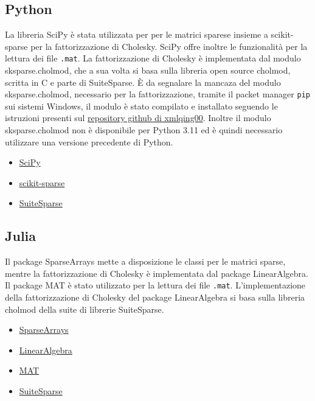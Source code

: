 \documentclass[a4paper, 12pt]{article}
\begin{document}
        \subsection{Python}
            La libreria SciPy è stata utilizzata per per le matrici sparese insieme a scikit-sparse per la 
            fattorizzazione di Cholesky.
            SciPy offre inoltre le funzionalità per la lettura dei file \texttt{.mat}.
            La fattorizzazione di Cholesky è implementata dal modulo sksparse.cholmod, che a sua volta si basa sulla
            libreria open source cholmod, scritta in C e parte di SuiteSparse.
            \`E da segnalare la mancaza del modulo sksparse.cholmod, necessario per la fattorizzazione, tramite il 
            packet manager \texttt{pip} sui sistemi Windows, il modulo è stato compilato e installato seguendo le
            istruzioni presenti sul 
            \href{https://github.com/xmlyqing00/Cholmod-Scikit-Sparse-Windows}{repository github di xmlqing00}.
            Inoltre il modulo sksparse.cholmod non è disponibile per Python 3.11
            ed è quindi necessario utilizzare una versione precedente di Python.

            \begin{itemize}
                \item \href{https://www.scipy.org/}{SciPy}
                \item \href{https://github.com/scikit-sparse/scikit-sparse} {scikit-sparse}
                \item \href{http://suitesparse.com}{SuiteSparse}
            \end{itemize}

        \subsection{Julia}
            Il package SparseArrays mette a disposizione le classi per le matrici sparse, mentre la fattorizzazione di 
            Cholesky
            è implementata dal package LinearAlgebra.
            Il package MAT è stato utilizzato per la lettura dei file \texttt{.mat}.
            L'implementazione della fattorizzazione di Cholesky del package LinearAlgebra si basa sulla libreria cholmod
            della suite di librerie SuiteSparse.

            \begin{itemize}
                \item \href{https://docs.julialang.org/en/v1/stdlib/SparseArrays/}{SparseArrays}
                \item \href{https://docs.julialang.org/en/v1/stdlib/LinearAlgebra/}{LinearAlgebra}
                \item \href{https://github.com/JuliaIO/MAT.jl}{MAT}
                \item \href{http://suitesparse.com}{SuiteSparse}
            \end{itemize}
\end{document}
